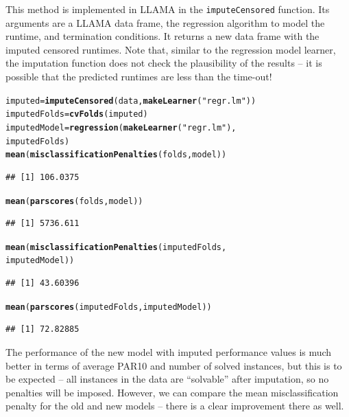 \documentclass{article}\usepackage[]{graphicx}\usepackage[]{color}
\makeatletter
\newcommand{\hlstr}[1]{\textcolor[rgb]{0.192,0.494,0.8}{#1}}%
\newcommand{\hlstd}[1]{\textcolor[rgb]{0.345,0.345,0.345}{#1}}%
\newcommand{\hlkwb}[1]{\textcolor[rgb]{0.69,0.353,0.396}{#1}}%
\newcommand{\hlkwd}[1]{\textcolor[rgb]{0.737,0.353,0.396}{\textbf{#1}}}%
\newenvironment{kframe}{%
 \def\at@end@of@kframe{}%
 \ifinner\ifhmode%
  \def\at@end@of@kframe{\end{minipage}}%
  \begin{minipage}{\columnwidth}%
 \fi\fi%
 \def\FrameCommand##1{\hskip\@totalleftmargin \hskip-\fboxsep
 \colorbox{shadecolor}{##1}\hskip-\fboxsep
     \hskip-\linewidth \hskip-\@totalleftmargin \hskip\columnwidth}%
 \MakeFramed {\advance\hsize-\width
   \@totalleftmargin\z@ \linewidth\hsize
   \@setminipage}}%
 {\par\unskip\endMakeFramed%
 \at@end@of@kframe}
\newenvironment{knitrout}{}{} %
\makeatother
\begin{document}
This method is implemented in LLAMA in the \lstinline{imputeCensored} function.
Its arguments are a LLAMA data frame, the regression algorithm to model the
runtime, and termination conditions. It returns a new data frame with the
imputed censored runtimes. Note that, similar to the regression model learner,
the imputation function does not check the plausibility of the results -- it is
possible that the predicted runtimes are less than the time-out!

\begin{knitrout}
\color{fgcolor}\begin{kframe}
\begin{alltt}
\hlstd{imputed} \hlkwb{=} \hlkwd{imputeCensored}\hlstd{(data,} \hlkwd{makeLearner}\hlstd{(}\hlstr{"regr.lm"}\hlstd{))}
\hlstd{imputedFolds} \hlkwb{=} \hlkwd{cvFolds}\hlstd{(imputed)}
\hlstd{imputedModel} \hlkwb{=} \hlkwd{regression}\hlstd{(}\hlkwd{makeLearner}\hlstd{(}\hlstr{"regr.lm"}\hlstd{),}
    \hlstd{imputedFolds)}
\hlkwd{mean}\hlstd{(}\hlkwd{misclassificationPenalties}\hlstd{(folds, model))}
\end{alltt}
\begin{verbatim}
## [1] 106.0375
\end{verbatim}
\begin{alltt}
\hlkwd{mean}\hlstd{(}\hlkwd{parscores}\hlstd{(folds, model))}
\end{alltt}
\begin{verbatim}
## [1] 5736.611
\end{verbatim}
\begin{alltt}
\hlkwd{mean}\hlstd{(}\hlkwd{misclassificationPenalties}\hlstd{(imputedFolds,}
    \hlstd{imputedModel))}
\end{alltt}
\begin{verbatim}
## [1] 43.60396
\end{verbatim}
\begin{alltt}
\hlkwd{mean}\hlstd{(}\hlkwd{parscores}\hlstd{(imputedFolds, imputedModel))}
\end{alltt}
\begin{verbatim}
## [1] 72.82885
\end{verbatim}
\end{kframe}
\end{knitrout}

The performance of the new model with imputed performance values is much better
in terms of average PAR10 and number of solved instances, but this is to be
expected -- all instances in the data are ``solvable'' after imputation, so no
penalties will be imposed. However, we can compare the mean misclassification
penalty for the old and new models -- there is a clear improvement there as
well.
\end{document}
